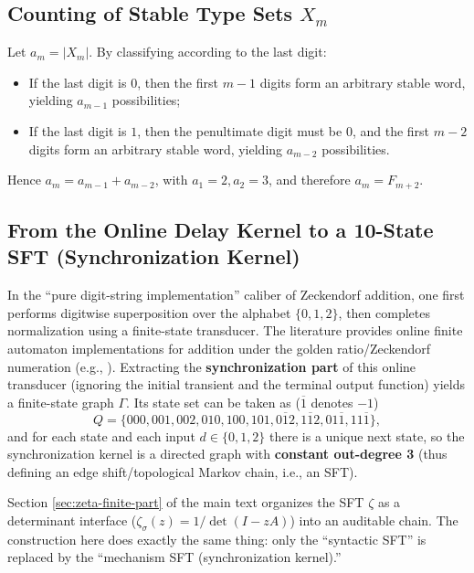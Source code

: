 \subsection{Counting of Stable Type Sets \texorpdfstring{$X_m$}{X\_m}}
\label{subsec:sync-kernel-counting}
Let $a_m=|X_m|$. By classifying according to the last digit:
\begin{itemize}
  \item If the last digit is $0$, then the first $m-1$ digits form an arbitrary stable word, yielding $a_{m-1}$ possibilities;
  \item If the last digit is $1$, then the penultimate digit must be $0$, and the first $m-2$ digits form an arbitrary stable word, yielding $a_{m-2}$ possibilities.
\end{itemize}
Hence $a_m=a_{m-1}+a_{m-2}$, with $a_1=2,a_2=3$, and therefore $a_m=F_{m+2}$.

\subsection{From the Online Delay Kernel to a 10-State SFT (Synchronization Kernel)}
In the ``pure digit-string implementation'' caliber of Zeckendorf addition, one first performs digitwise superposition over the alphabet $\{0,1,2\}$, then completes normalization using a finite-state transducer. The literature provides online finite automaton implementations for addition under the golden ratio/Zeckendorf numeration (e.g., \cite{Frougny1999OnlineAddition}).
Extracting the \textbf{synchronization part} of this online transducer (ignoring the initial transient and the terminal output function) yields a finite-state graph $\Gamma$. Its state set can be taken as ($\overline{1}$ denotes $-1$)
\[
Q=\{000,001,002,010,100,101,0\overline{1}2,1\overline{1}2,01\overline{1},11\overline{1}\},
\]
and for each state and each input $d\in\{0,1,2\}$ there is a unique next state, so the synchronization kernel is a directed graph with \textbf{constant out-degree 3} (thus defining an edge shift/topological Markov chain, i.e., an SFT).


\begin{remark}
Section \ref{sec:zeta-finite-part} of the main text organizes the SFT $\zeta$ as a determinant interface ($\zeta_\sigma(z)=1/\det(I-zA)$) into an auditable chain. The construction here does exactly the same thing: only the ``syntactic SFT'' is replaced by the ``mechanism SFT (synchronization kernel).''
\end{remark}

